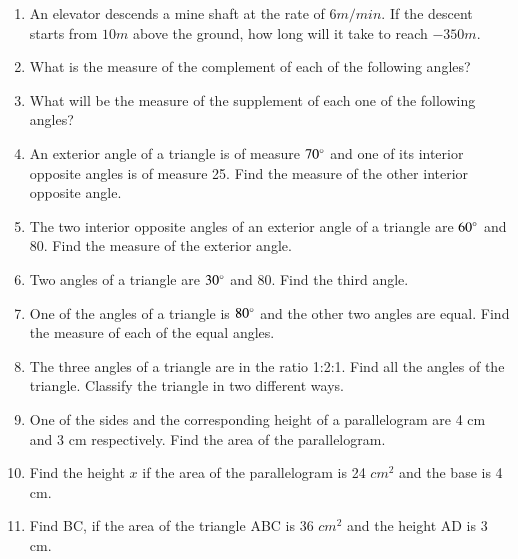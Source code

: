 \begin{enumerate}[label=\thesubsection.\arabic*, ref=\thesubsection.\theenumi,resume*]
\begin{enumerate}
		\end{enumerate}
	\item An elevator descends a mine shaft at the rate of $6m/min$.  If the descent starts from $10m$ above the ground, how long will it take to reach $-350m$.
	\item What is the measure of the complement of each of the following angles? 
		\begin{enumerate}
\end{enumerate}
\item What will be the measure of the supplement of each one of the following angles? 
		\begin{enumerate}
\end{enumerate}
\item An exterior angle of a triangle is of measure $70\degree$ and one of its interior opposite angles is of measure 25\degree. Find the measure of the other interior opposite angle.
\item The two interior opposite angles of an exterior angle of a triangle are $60\degree$ and 80\degree. Find the measure of the exterior angle.
\item 	Two angles of a triangle are $30\degree$ and 80\degree. Find the third angle. 
\item  One of the angles of a triangle is $80\degree$ and the other two angles are equal. Find the measure of each of the equal angles.
\item  The three angles of a triangle are in the ratio 1:2:1. Find all the angles of the triangle. Classify the triangle in two different ways.
\item One of the sides and the corresponding height of a parallelogram are 4 cm and 3 cm respectively. Find the area of the parallelogram.
\item Find the height $x$ if the area of the parallelogram is 24 $cm^2$ and the base is 4 cm.
\item Find BC, if the area of the triangle ABC is 36 $cm^2$ and the height AD is 3 cm.
		\end{enumerate}
